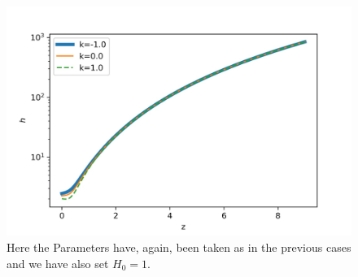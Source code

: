 \documentclass[a4paper, 11pt]{FSKH_623_Report}
\numberwithin{equation}{section}
\begin{document}
\begin{figure}[H]
\centering
\includegraphics[scale=0.9]{Figures/ch_H.jpg}
\caption{Here the Parameters have, again, been taken as in the previous cases and we have also set $H_{0}=1$.}
\label{fig:ChH}
\end{figure}
\end{document}

